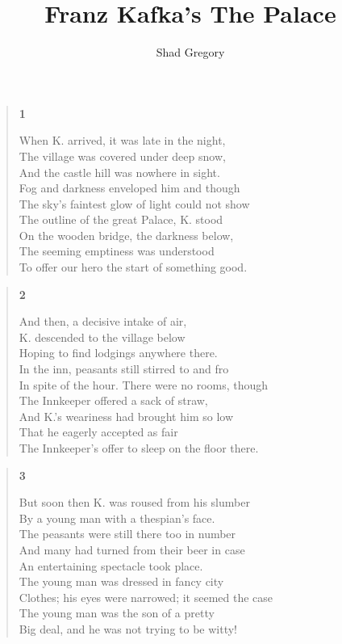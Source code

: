 \documentclass{article}
\title{Franz Kafka's The Palace}
\author{Shad Gregory}
\date{}
\begin{document}
\maketitle
\begin{verse}
  \begin{center}
    \textbf{1} \\
  \end{center}
  When K. arrived, it was late in the night, \\
  The village was covered under deep snow, \\
  And the castle hill was nowhere in sight. \\
  Fog and darkness enveloped him and though \\
  The sky's faintest glow of light could not show \\
  The outline of the great Palace, K. stood \\
  On the wooden bridge, the darkness below, \\
  The seeming emptiness was understood \\
  To offer our hero the start of something good.
\end{verse}
\begin{verse}
  \begin{center}
    \textbf{2} \\
  \end{center}
  And then, a decisive intake of air, \\
  K. descended to the village below \\
  Hoping to find lodgings anywhere there. \\
  In the inn, peasants still stirred to and fro \\
  In spite of the hour. There were no rooms, though \\
  The Innkeeper offered a sack of straw, \\
  And K.'s weariness had brought him so low \\
  That he eagerly accepted as fair \\
  The Innkeeper's offer to sleep on the floor there. \\
\end{verse}
\begin{verse}
  \begin{center}
    \textbf{3} \\
  \end{center}
  But soon then K. was roused from his slumber \\
  By a young man with a thespian's face. \\
  The peasants were still there too in number \\
  And many had turned from their beer in case \\
  An entertaining spectacle took place. \\
  The young man was dressed in fancy city \\
  Clothes; his eyes were narrowed; it seemed the case \\
  The young man was the son of a pretty \\
  Big deal, and he was not trying to be witty!
\end{verse}
\end{document}
